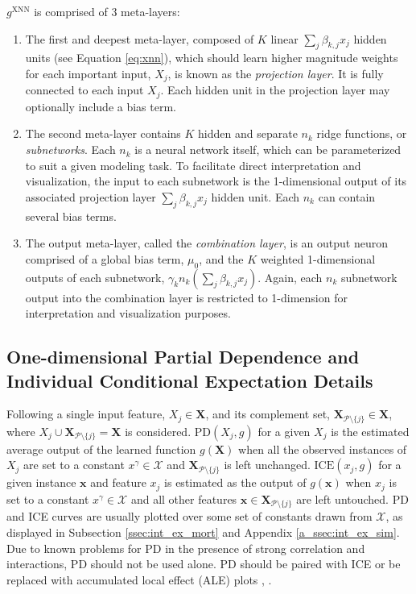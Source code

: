 \documentclass[information,article,submit,moreauthors,pdftex]{definitions/mdpi}
\begin{document}
\noindent $g^{\text{XNN}}$ is comprised of 3 meta-layers:

\begin{enumerate}[leftmargin=*,labelsep=4.9mm]
	\item The first and deepest meta-layer, composed of $K$ linear $\sum_j\beta_{k,j}x_j$ hidden units (see Equation \ref{eq:xnn}), which should learn higher magnitude weights for each important input, $X_j$, is known as the \textit{projection layer}. It is fully connected to each input $X_j$. Each hidden unit in the projection layer may optionally include a bias term.
	\item The second meta-layer contains $K$ hidden and separate $n_k$ ridge functions, or \textit{subnetworks}. Each $n_k$ is a neural network itself, which can be parameterized to suit a given modeling task. To facilitate direct interpretation and visualization, the input to each subnetwork is the 1-dimensional output of its associated projection layer $\sum_j\beta_{k,j}x_j$ hidden unit. Each $n_k$ can contain several bias terms.
	\item The output meta-layer, called the \textit{combination layer}, is an output neuron comprised of a global bias term, $\mu_0$, and the $K$ weighted 1-dimensional outputs of each subnetwork, $\gamma_kn_k(\sum_j\beta_{k,j}x_j)$. Again, each $n_k$ subnetwork output into the combination layer is restricted to 1-dimension for interpretation and visualization purposes.
\end{enumerate}

\subsection{One-dimensional Partial Dependence and Individual Conditional Expectation Details}\label{a_ssec:pd_ice}

Following \citet{esl} a single input feature, $X_j \in \mathbf{X}$, and its complement set, $\mathbf{X}_{\mathcal{P} \setminus \{j\}} \in \mathbf{X}$, where $X_j \cup \mathbf{X}_{\mathcal{P} \setminus \{j\}} = \mathbf{X}$ is considered. $\text{PD}(X_j, g)$ for a given $X_j$ is the estimated average output of the learned function $g(\mathbf{X})$ when all the observed instances of $X_j$ are set to a constant $x^\gamma \in \mathcal{X}$ and $\mathbf{X}_{\mathcal{P} \setminus \{j\}}$ is left unchanged. $\text{ICE}(x_j, g)$ for a given instance $\mathbf{x}$ and feature $x_j$ is estimated as the output of $g(\mathbf{x})$ when $x_j$ is set to a constant $x^\gamma \in \mathcal{X}$ and all other features $\mathbf{x} \in \mathbf{X}_{\mathcal{P} \setminus \{j\}}$ are left untouched. PD and ICE curves are usually plotted over some set of constants drawn from $\mathcal{X}$, as displayed in Subsection \ref{ssec:int_ex_mort} and Appendix \ref{a_ssec:int_ex_sim}. Due to known problems for PD in the presence of strong correlation and interactions, PD should not be used alone. PD should be paired with ICE or be replaced with accumulated local effect (ALE) plots \cite{ice_plots}, \cite{ale_plot}.
\end{document}

